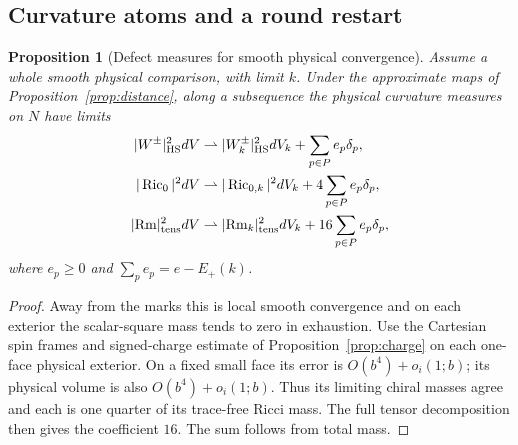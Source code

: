\documentclass[11pt]{article}
\newtheorem{proposition}[theorem]{Proposition}
\theoremstyle{definition}
\theoremstyle{remark}
\begin{document}
\subsection{Curvature atoms and a round restart}

\begin{proposition}[Defect measures for smooth physical convergence]\label{prop:atoms}
Assume a whole smooth physical comparison, with limit \(k\). Under the approximate maps of Proposition~\ref{prop:distance}, along a subsequence the physical curvature measures on \(N\) have limits
\[
\begin{aligned}
 |W^\pm|_{\rm HS}^2dV &\rightharpoonup |W_k^\pm|_{\rm HS}^2dV_k+\sum_{p\in P}e_p\delta_p,\\
 |\operatorname{Ric}_0|^2dV &\rightharpoonup |\operatorname{Ric}_{0,k}|^2dV_k+4\sum_{p\in P}e_p\delta_p,\\
 |\mathrm{Rm}|_{\rm tens}^2dV &\rightharpoonup |\mathrm{Rm}_k|_{\rm tens}^2dV_k+16\sum_{p\in P}e_p\delta_p ,
\end{aligned}
\]
where \(e_p\ge0\) and \(\sum_p e_p=e-E_+(k)\).
\end{proposition}
\begin{proof}
Away from the marks this is local smooth convergence and on each exterior the scalar-square mass tends to zero in exhaustion. Use the Cartesian spin frames and signed-charge estimate of Proposition~\ref{prop:charge} on each one-face physical exterior. On a fixed small face its error is \(O(b^4)+o_i(1;b)\); its physical volume is also \(O(b^4)+o_i(1;b)\). Thus its limiting chiral masses agree and each is one quarter of its trace-free Ricci mass. The full tensor decomposition then gives the coefficient \(16\). The sum follows from total mass.
\end{proof}
\end{document}
